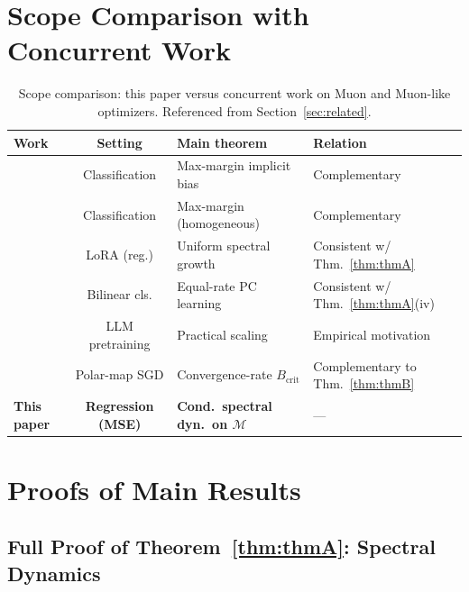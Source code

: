 \documentclass{article}
\begin{document}




\appendix

\section{Scope Comparison with Concurrent Work}
\label{app:scope_comparison}

\begin{table}[h]
\centering
\caption{Scope comparison: this paper versus concurrent work on Muon and Muon-like optimizers. Referenced from Section~\ref{sec:related}.}
\label{tab:scope}
\footnotesize
\setlength{\tabcolsep}{3pt}
\begin{tabular}{lcll}
\toprule
Work & Setting & Main theorem & Relation \\
\midrule
\citep{fan2025muon}      & Classification & Max-margin implicit bias  & Complementary \\
\citep{gronich2026muon}  & Classification & Max-margin (homogeneous)  & Complementary \\
\citep{kang2026muon}     & LoRA (reg.)    & Uniform spectral growth   & Consistent w/ Thm.~\ref{thm:thmA} \\
\citep{vasudeva2025imbalanced}& Bilinear cls.  & Equal-rate PC learning    & Consistent w/ Thm.~\ref{thm:thmA}(iv) \\
\citep{liu2025moonlight} & LLM pretraining& Practical scaling         & Empirical motivation \\
\citep{sato2025cbs}      & Polar-map SGD  & Convergence-rate $B_{\mathrm{crit}}$ & Complementary to Thm.~\ref{thm:thmB} \\
\textbf{This paper}      & \textbf{Regression (MSE)} & \textbf{Cond.\ spectral dyn.\ on $\mathcal M$} & --- \\
\bottomrule
\end{tabular}
\end{table}

\section{Proofs of Main Results}
\label{app:proofs}

\subsection{Full Proof of Theorem~\ref{thm:thmA}: Spectral Dynamics}
\label{app:proof_thmA}
\end{document}

